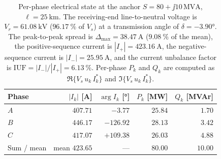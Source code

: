 \begin{table}[ht]
\centering
\renewcommand{\arraystretch}{1.18}
\begin{tabular}{l r r r r}
\toprule
Phase & $|I_{k}|$ [A] & $\arg I_{k}$ [\si{\degree}] & $P_{k}$ [MW] & $Q_{k}$ [MVAr] \\
\midrule
$A$ & $407.71$ & $-3.77$    & $25.84$ & $1.70$ \\
$B$ & $446.17$ & $-126.92$  & $28.13$ & $3.42$ \\
$C$ & $417.07$ & $+109.38$  & $26.03$ & $4.88$ \\
\midrule
Sum / mean & mean $423.65$ & --- & $80.00$ & $10.00$ \\
\bottomrule
\end{tabular}
\caption{Per-phase electrical state at the anchor
$S=80+\jj 10\,\si{\mega\volt\ampere}$,
$\ell=\SI{25}{\kilo\metre}$. The receiving-end line-to-neutral voltage
is $V_{r}=\SI{61.08}{\kilo\volt}$ ($\SI{96.17}{\percent}$ of $V_{s}$)
at a transmission angle of $\delta=-3.90\si{\degree}$. The peak-to-peak
spread is $\Delta_{\max}=\SI{38.47}{\ampere}$ ($\SI{9.08}{\percent}$ of
the mean), the positive-sequence current is
$|I_{+}|=\SI{423.16}{\ampere}$, the negative-sequence current is
$|I_{-}|=\SI{25.95}{\ampere}$, and the current unbalance factor is
$\mathrm{IUF}=|I_{-}|/|I_{+}|=\SI{6.13}{\percent}$. Per-phase $P_{k}$
and $Q_{k}$ are computed as $\Re\{V_{s}\,u_{k}\,I_{k}^{*}\}$ and
$\Im\{V_{s}\,u_{k}\,I_{k}^{*}\}$.}
\label{tab:anchor-state}
\end{table}
